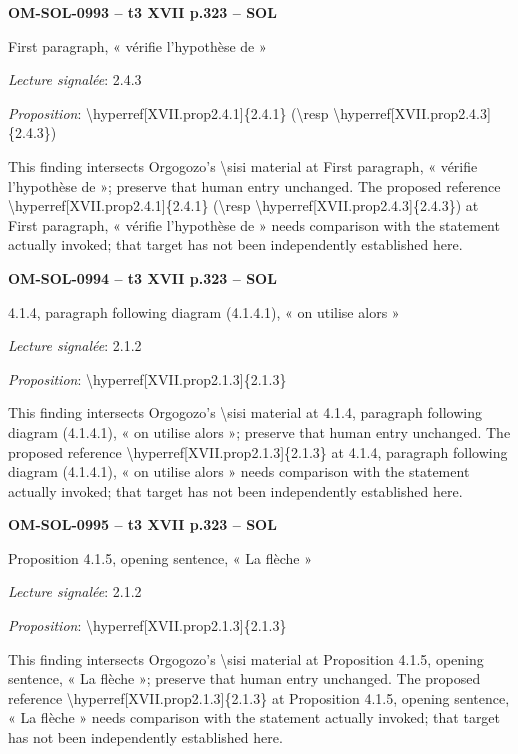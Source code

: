 \par\noindent\textbf{OM-SOL-0993 -- t3 XVII p.323 -- SOL}\par
First paragraph, « vérifie l'hypothèse de »\par
\emph{Lecture signalée}: 2.4.3\par
\emph{Proposition}: \textbackslash{}hyperref[XVII.prop2.4.1]\{2.4.1\} (\textbackslash{}resp \textbackslash{}hyperref[XVII.prop2.4.3]\{2.4.3\})\par
This finding intersects Orgogozo's \textbackslash{}sisi material at First paragraph, « vérifie l'hypothèse de »; preserve that human entry unchanged. The proposed reference \textbackslash{}hyperref[XVII.prop2.4.1]\{2.4.1\} (\textbackslash{}resp \textbackslash{}hyperref[XVII.prop2.4.3]\{2.4.3\}) at First paragraph, « vérifie l'hypothèse de » needs comparison with the statement actually invoked; that target has not been independently established here.\par
\par\noindent\textbf{OM-SOL-0994 -- t3 XVII p.323 -- SOL}\par
4.1.4, paragraph following diagram (4.1.4.1), « on utilise alors »\par
\emph{Lecture signalée}: 2.1.2\par
\emph{Proposition}: \textbackslash{}hyperref[XVII.prop2.1.3]\{2.1.3\}\par
This finding intersects Orgogozo's \textbackslash{}sisi material at 4.1.4, paragraph following diagram (4.1.4.1), « on utilise alors »; preserve that human entry unchanged. The proposed reference \textbackslash{}hyperref[XVII.prop2.1.3]\{2.1.3\} at 4.1.4, paragraph following diagram (4.1.4.1), « on utilise alors » needs comparison with the statement actually invoked; that target has not been independently established here.\par
\par\noindent\textbf{OM-SOL-0995 -- t3 XVII p.323 -- SOL}\par
Proposition 4.1.5, opening sentence, « La flèche »\par
\emph{Lecture signalée}: 2.1.2\par
\emph{Proposition}: \textbackslash{}hyperref[XVII.prop2.1.3]\{2.1.3\}\par
This finding intersects Orgogozo's \textbackslash{}sisi material at Proposition 4.1.5, opening sentence, « La flèche »; preserve that human entry unchanged. The proposed reference \textbackslash{}hyperref[XVII.prop2.1.3]\{2.1.3\} at Proposition 4.1.5, opening sentence, « La flèche » needs comparison with the statement actually invoked; that target has not been independently established here.\par
